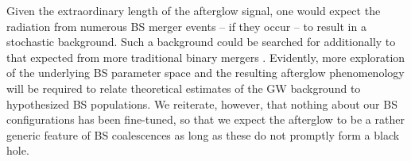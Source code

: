Given the extraordinary length of the afterglow signal, one
would expect the radiation from numerous BS merger events
-- if they occur -- to result in a stochastic background.
Such a background could be searched for additionally
to that expected from more traditional binary mergers
\cite{Croon:2018ftb}. Evidently, more exploration of the
underlying BS parameter space and the resulting afterglow
phenomenology will be required to relate theoretical
estimates of the GW background to hypothesized BS populations.
We reiterate, however, that nothing about our BS configurations
has been fine-tuned, so that we expect the afterglow to be a
rather generic feature of BS coalescences as long as these do
not promptly form a black hole.






